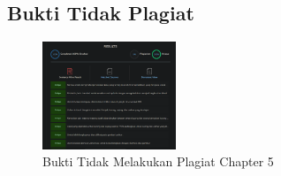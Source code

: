 \subsection{Bukti Tidak Plagiat}
\begin{figure}[H]
\centering
	\includegraphics[width=4cm]{figures/1174004/tugas5/buktiplagiat/1.PNG}
	\caption{Bukti Tidak Melakukan Plagiat Chapter 5}
\end{figure}

